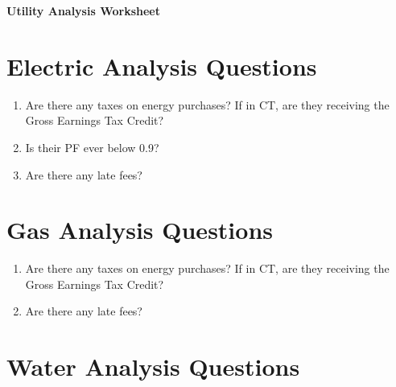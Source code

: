 \documentclass[./main.tex]{subfiles}
\begin{document}
\begin{center}
\Large\textbf{Utility Analysis Worksheet}
\end{center}

\newlength{\answerspace}
\setlength{\answerspace}{2cm}  %

\section*{Electric Analysis Questions}

\begin{enumerate}[leftmargin=*]
\item Are there any taxes on energy purchases? If in CT, are they receiving the Gross Earnings Tax Credit?

\vspace{\answerspace}

\item Is their PF ever below 0.9?

\vspace{\answerspace}

\item Are there any late fees? 

\vspace{\answerspace}

\end{enumerate}

\section*{Gas Analysis Questions}

\begin{enumerate}[leftmargin=*]
\item Are there any taxes on energy purchases? If in CT, are they receiving the Gross Earnings Tax Credit?

\vspace{\answerspace}

\item Are there any late fees? 

\vspace{\answerspace}

\end{enumerate}

\clearpage 

\section*{Water Analysis Questions}
\end{document}
